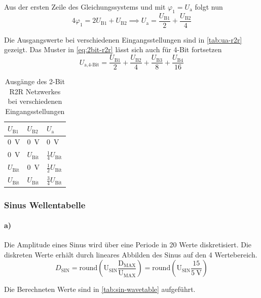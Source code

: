 Aus der ersten Zeile des Gleichungssystems und mit $\varphi_1 = U_\text{a}$ folgt nun
\begin{equation}
4\varphi_1 = 2U_\text{B1} + U_\text{B2} \implies U_\text{a} = \frac{U_\text{B1}}{2} + \frac{U_\text{B2}}{4}
\label{eq:2bit-r2r}
\end{equation}

Die Ausgangswerte bei verschiedenen Eingangsstellungen sind in \autoref{tab:ua-r2r} gezeigt. Das Muster in \autoref{eq:2bit-r2r} lässt sich auch für 4-Bit fortsetzen
\[
U_\text{a,4-Bit} = \frac{U_\text{B1}}{2} + \frac{U_\text{B2}}{4} + \frac{U_\text{B3}}{8} + \frac{U_\text{B4}}{16}
\]

\begin{table}[t]
    \centering
    \caption{Ausgänge des 2-Bit R2R Netzwerkes bei verschiedenen Eingangsstellungen}\label{tab:ua-r2r}
    \begin{tabularx}{10cm}{YYY}
         \toprule
         $U_\text{B1}$  & $U_\text{B2}$  & $U_\text{a}$               \\ \midrule
         \SI{0}{\volt}  & \SI{0}{\volt}  & \SI{0}{\volt}              \\
         \SI{0}{\volt}  & $U_\text{Bit}$ & $\frac{1}{4} U_\text{Bit}$ \\
         $U_\text{Bit}$ & \SI{0}{\volt}  & $\frac{1}{2} U_\text{Bit}$ \\
         $U_\text{Bit}$ & $U_\text{Bit}$ & $\frac{3}{4} U_\text{Bit}$ \\
         \bottomrule
    \end{tabularx}
\end{table}

\subsubsection{Sinus Wellentabelle}

\paragraph{a)} Die Amplitude eines Sinus wird über eine Periode in 20 Werte diskretisiert. Die diskreten Werte erhält durch lineares Abbilden des Sinus auf den \SI{4}{\bit} Wertebereich.
\[
D_\text{SIN} = \mathrm{round\left(U_\text{SIN}\frac{D_\text{MAX}}{U_\text{MAX}}\right)} = \mathrm{round\left(U_\text{SIN}\frac{15}{\SI{5}{\volt}}\right)} 
\]

Die Berechneten Werte sind in \autoref{tab:sin-wavetable} aufgeführt.


